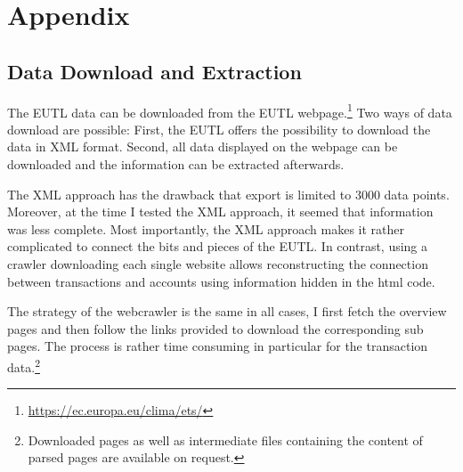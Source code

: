 \documentclass[authoryear]{elsarticle}
\begin{document}
\newpage 

\appendix
\section*{Appendix}
\renewcommand{\thesubsection}{\Alph{subsection}}
\renewcommand{\thetable}{\Alph{subsection}.\arabic{table}}
\setcounter{table}{0}

\subsection{Data Download and Extraction}\label{app:download}

The EUTL data can be downloaded from the EUTL webpage.\footnote{\url{https://ec.europa.eu/clima/ets/}} Two ways of data download are possible: First, the EUTL offers the possibility to download the data in XML format. Second, all data displayed on the webpage can be downloaded and the information can be extracted afterwards. 

The XML approach has the drawback that export is limited to 3000 data points. Moreover, at the time I tested the XML approach, it seemed that information was less complete. Most importantly, the XML approach makes it rather complicated to connect the bits and pieces of the EUTL. In contrast, using a crawler downloading each single website allows reconstructing the connection between transactions and accounts using information hidden in the html code. 

The strategy of the webcrawler is the same in all cases, I first fetch the overview pages and then follow the links provided to download the corresponding sub pages. The process is rather time consuming in particular for the transaction data.\footnote{Downloaded pages as well as intermediate files containing the content of parsed pages are available on request.} 
\end{document}
